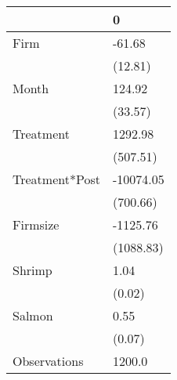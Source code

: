 \begin{tabular}{ll}
\toprule
{} &          0 \\
\midrule
Firm           &     -61.68 \\
               &    (12.81) \\
Month          &     124.92 \\
               &    (33.57) \\
Treatment      &    1292.98 \\
               &   (507.51) \\
Treatment*Post &  -10074.05 \\
               &   (700.66) \\
Firmsize       &   -1125.76 \\
               &  (1088.83) \\
Shrimp         &       1.04 \\
               &     (0.02) \\
Salmon         &       0.55 \\
               &     (0.07) \\
Observations   &     1200.0 \\
\bottomrule
\end{tabular}
